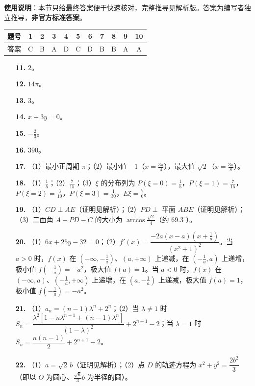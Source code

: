 
\begin{gknotice}
\textbf{使用说明}：本节只给最终答案便于快速核对，完整推导见解析版。答案为编写者独立推导，\textbf{非官方标准答案}。
\end{gknotice}

\begin{center}\begin{tabular}{ccccccccccc}
\toprule
题号 & 1 & 2 & 3 & 4 & 5 & 6 & 7 & 8 & 9 & 10 \\
\midrule
答案 & C & B & A & D & C & D & B & B & A & A \\
\bottomrule
\end{tabular}\end{center}

\begin{itemize}[leftmargin=2.6em]
  \item[\textbf{11.}] $2$。
  \item[\textbf{12.}] $14\pi$。
  \item[\textbf{13.}] $3$。
  \item[\textbf{14.}] $x+3y=0$。
  \item[\textbf{15.}] $-\frac23$。
  \item[\textbf{16.}] $390$。
\end{itemize}

\begin{itemize}[leftmargin=2.6em]
  \item[\textbf{17.}] （1）最小正周期 $\pi$；（2）最小值 $-1$（$x=\frac{3\pi}{4}$），最大值 $\sqrt2$（$x=\frac{3\pi}{8}$）。
  \item[\textbf{18.}] （1）$\frac15$；（2）$\frac7{15}$；（3）$\xi$ 的分布列为 $P(\xi=0)=\frac15$，$P(\xi=1)=\frac7{15}$，$P(\xi=2)=\frac3{10}$，$P(\xi=3)=\frac1{30}$，$E\xi=\frac76$。
  \item[\textbf{19.}] （1）$CD\perp AE$（证明见解析）；（2）$PD\perp$ 平面 $ABE$（证明见解析）；（3）二面角 $A-PD-C$ 的大小为 $\arccos\frac{\sqrt2}{4}$（约 $69.3^\circ$）。
  \item[\textbf{20.}] （1）$6x+25y-32=0$；（2）$f'(x)=\dfrac{-2a\left(x-a\right)\left(x+\frac1a\right)}{(x^2+1)^2}$。当 $a>0$ 时，$f(x)$ 在 $\left(-\infty,-\frac1a\right)$、$(a,+\infty)$ 上递减，在 $\left(-\frac1a,a\right)$ 上递增，极小值 $f\left(-\frac1a\right)=-a^2$，极大值 $f(a)=1$。当 $a<0$ 时，$f(x)$ 在 $(-\infty,a)$、$\left(-\frac1a,+\infty\right)$ 上递增，在 $\left(a,-\frac1a\right)$ 上递减，极大值 $f(a)=1$，极小值 $f\left(-\frac1a\right)=-a^2$。
  \item[\textbf{21.}] （1）$a_n=(n-1)\lambda^n+2^n$；（2）当 $\lambda\ne1$ 时 $S_n=\dfrac{\lambda^2\left[1-n\lambda^{n-1}+(n-1)\lambda^n\right]}{(1-\lambda)^2}+2^{n+1}-2$；当 $\lambda=1$ 时 $S_n=\dfrac{n(n-1)}2+2^{n+1}-2$。
  \item[\textbf{22.}] （1）$a=\sqrt2\,b$（证明见解析）；（2）点 $D$ 的轨迹方程为 $x^2+y^2=\dfrac{2b^2}{3}$（即以 $O$ 为圆心、$\frac{\sqrt6}{3}b$ 为半径的圆）。
\end{itemize}

